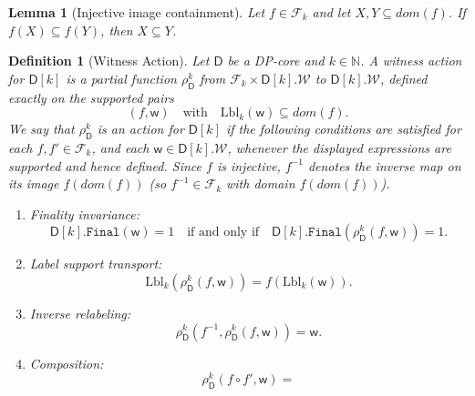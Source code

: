 \documentclass[10pt,a4paper]{amsart}
\newtheorem{lemma}{Lemma}
\newtheorem{definition}{Definition}
\newcommand{\N}{\mathbb{N}}
\newcommand{\action}{\rho}
\newcommand{\allwitnesses}{\mathcal{W}}
\newcommand{\awitness}{\mathsf{w}}
\newcommand{\domain}{dom}
\newcommand{\dpcore}{\mathsf{D}}
\newcommand{\finalwitnessgenericcore}{\mathtt{Final}}
\newcommand{\relabelclass}{\mathcal{F}}
\newcommand{\relabelingfunction}{f}
\newcommand{\treewidthvalue}{k}
\begin{document}
\begin{lemma}[Injective image containment]
\label{lemma:injective-image-containment}
Let $f\in \relabelclass_{\treewidthvalue}$ and let $X,Y\subseteq \domain(f)$. If $f(X)\subseteq f(Y)$, then $X\subseteq Y$.
\end{lemma}

\begin{definition}[Witness Action]\label{definition:witnessaction}
Let $\dpcore$ be a DP-core and $k\in \N$. A witness action for $\dpcore[\treewidthvalue]$ is a partial function
$\action_{\dpcore}^{\treewidthvalue}$ from $\relabelclass_\treewidthvalue \times \dpcore[\treewidthvalue].\allwitnesses$ to $\dpcore[\treewidthvalue].\allwitnesses$, defined exactly on the supported pairs
\[
(\relabelingfunction,\awitness)
\quad\text{with}\quad
\mathrm{Lbl}_{\treewidthvalue}(\awitness)\subseteq \domain(\relabelingfunction).
\]
We say that $\action_{\dpcore}^{\treewidthvalue}$ is an action for $\dpcore[\treewidthvalue]$ if
the following conditions are satisfied for each $\relabelingfunction,\relabelingfunction'\in \relabelclass_{\treewidthvalue}$, and
each $\awitness \in \dpcore[\treewidthvalue].\allwitnesses$, whenever the displayed expressions are supported and hence defined.
Since $\relabelingfunction$ is injective, $\relabelingfunction^{-1}$ denotes the inverse map on its image $\relabelingfunction(\domain(\relabelingfunction))$ (so $\relabelingfunction^{-1}\in \relabelclass_\treewidthvalue$ with domain $\relabelingfunction(\domain(\relabelingfunction))$).
\begin{enumerate}
	    \item \label{condition:relabeldpcore-condition-one}
	    Finality invariance:
	    \[
	    \dpcore[\treewidthvalue].\finalwitnessgenericcore(\awitness)=1
	    \quad \text{if and only if}\quad
	    \dpcore[\treewidthvalue].\finalwitnessgenericcore(\action_{\dpcore}^{\treewidthvalue}(\relabelingfunction,\awitness))=1.
	    \]
	    \item \label{condition:relabeldpcore-condition-support-transport}
	    Label support transport:
	    \[
	    \mathrm{Lbl}_{\treewidthvalue}(\action_{\dpcore}^{\treewidthvalue}(\relabelingfunction,\awitness))
	    = \relabelingfunction(\mathrm{Lbl}_{\treewidthvalue}(\awitness)).
	    \]
	    \item Inverse relabeling: \label{condition:relabeldpcore-condition-two} \[\action_{\dpcore}^{\treewidthvalue}(\relabelingfunction^{-1},\action_{\dpcore}^{\treewidthvalue}(\relabelingfunction,\awitness)) = \awitness.\]
	    \item Composition: \label{condition:relabeldpcore-condition-three} \[\action_{\dpcore}^{\treewidthvalue}(\relabelingfunction\circ \relabelingfunction',\awitness) =
\]
\end{enumerate}
\end{definition}
\end{document}

